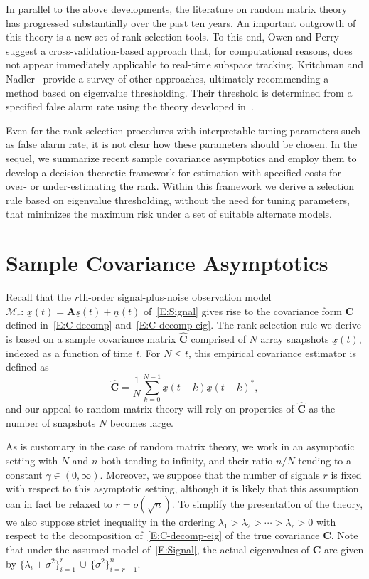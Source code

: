 \documentclass[final]{IEEEtran}
\newcommand{\vectorsymbol}{\underline}
\newcommand{\matrixsymbol}{\boldsymbol}
\newcommand{\mA}{\matrixsymbol{A}}
\newcommand{\mC}{\matrixsymbol{C}}
\newcommand{\mhC}{\widehat{\matrixsymbol{C}}}
\newcommand{\vn}{\vectorsymbol{n}}
\newcommand{\vs}{\vectorsymbol{s}}
\newcommand{\vx}{\vectorsymbol{x}}
\begin{document}
In parallel to the above developments, the literature on random matrix theory
has progressed substantially over the past ten years. An important outgrowth of this theory is
a new set of rank-selection tools.  To this end, Owen and Perry~\cite{owen2009bcv} suggest a
cross-validation-based approach that, for computational reasons, does not appear immediately applicable to real-time subspace tracking. Kritchman and
Nadler~\cite{kritchman2008dnc} provide a survey of other approaches,
ultimately recommending a method based on eigenvalue thresholding. %
Their threshold is determined from a specified false alarm rate using the
theory developed in~\cite{johansson2000sfa, johnstone2001dle, baik2005pto, baik2006els, paul2007ase, onatski2007adp}.

Even for the rank selection procedures with interpretable tuning parameters such as false alarm rate, it is not clear how these parameters should be chosen.  In the sequel, we summarize recent sample covariance asymptotics and employ them to develop a decision-theoretic framework for estimation with specified costs for over- or under-estimating the rank.  Within this framework we derive a selection rule based on eigenvalue thresholding, without the need for tuning parameters, that minimizes the maximum risk under a set of suitable alternate models.

\section{Sample Covariance Asymptotics}%
\label{S:null-alt-rmt}

Recall that the $r$th-order signal-plus-noise observation model $\mathcal{M}_r\!:\, \vx(t) = \mA \vs(t) + \vn(t)$ of~\eqref{E:Signal} gives rise to the covariance form $\mC$ defined in~\eqref{E:C-decomp} and~\eqref{E:C-decomp-eig}.  The rank selection rule we derive is based on a sample covariance matrix $\mhC$ comprised of $N$ array snapshots $\vx(t)$, indexed as a function of time $t$.  For $N \leq t$, this empirical covariance estimator is defined as
\begin{equation}\label{E:C-empirical}
    \mhC = \frac{1}{N} \sum_{k=0}^{N-1} \vx(t-k) \vx(t-k)^*,
\end{equation}
and our appeal to random matrix theory will rely on properties of $\mhC$ as the number of snapshots $N$ becomes large.

As is customary in the case of random matrix theory, we work in an asymptotic setting with $N$ and $n$ both tending to infinity, and their ratio $n/N$ tending to a constant $\gamma \in (0,\infty)$.  Moreover, we suppose that the number of signals $r$ is fixed with respect to this asymptotic setting, although it is likely that this assumption can in fact be relaxed to $r = o(\sqrt{n})$.  To simplify the presentation of the theory, we also suppose strict inequality in the ordering
$\lambda_1 > \lambda_2 > \cdots > \lambda_r > 0$ with respect to the decomposition of~\eqref{E:C-decomp-eig} of the true covariance $\mC$.  Note that under the assumed model of~\eqref{E:Signal}, the actual eigenvalues of $\mC$ are given by $\{\lambda_i+\sigma^2\}_{i=1}^r \,\cup\, \{\sigma^2\}_{i=r+1}^n$.
\end{document}

